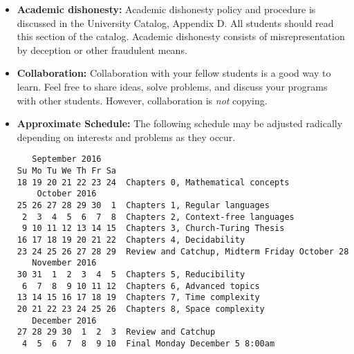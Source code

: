 \documentclass{article}
\begin{document}
\begin{itemize}
\item {\bf Academic dishonesty:} Academic dishonesty policy and
  procedure is discussed in the University Catalog, Appendix D.  All
  students should read this section of the catalog.  Academic
  dishonesty consists of misrepresentation by deception or other
  fraudulent means.

\item {\bf Collaboration:} Collaboration with your fellow students is
  a good way to learn.  Feel free to share ideas, solve problems, and
  discuss your programs with other students.  However, collaboration
  is {\em not} copying.

\item
{\bf Approximate Schedule:} The following schedule may be adjusted
radically depending on interests and problems as they occur.  


\begin{verbatim}
   September 2016     
Su Mo Tu We Th Fr Sa  
18 19 20 21 22 23 24  Chapters 0, Mathematical concepts
    October 2016      
25 26 27 28 29 30  1  Chapters 1, Regular languages
 2  3  4  5  6  7  8  Chapters 2, Context-free languages
 9 10 11 12 13 14 15  Chapters 3, Church-Turing Thesis
16 17 18 19 20 21 22  Chapters 4, Decidability
23 24 25 26 27 28 29  Review and Catchup, Midterm Friday October 28
   November 2016      
30 31  1  2  3  4  5  Chapters 5, Reducibility
 6  7  8  9 10 11 12  Chapters 6, Advanced topics
13 14 15 16 17 18 19  Chapters 7, Time complexity
20 21 22 23 24 25 26  Chapters 8, Space complexity
   December 2016      
27 28 29 30  1  2  3  Review and Catchup
 4  5  6  7  8  9 10  Final Monday December 5 8:00am
\end{verbatim}
\end{itemize}
\end{document}
